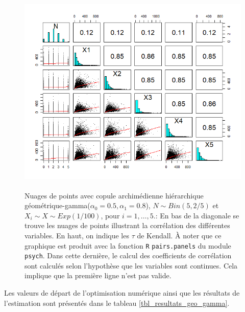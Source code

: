 \documentclass{article}
\begin{document}
	\begin{figure}[H]
		\centering
		\includegraphics[height=10cm]{Graph/scatterplot_geo_gamma.png}
		\caption[Nuages de points du scénario \ref{scenario_geo_gamma}]
		{Nuages de points avec copule archimédienne hiérarchique géométrique-gamma($\alpha_0=0.5, \alpha_1 = 0.8$), $N \sim Bin(5, 2/5)$ et $X_i \sim X \sim Exp(1/100)$, pour $i=1,\dots, 5$.:
			En bas de la diagonale se trouve les nuages de points illustrant la corrélation des différentes variables. En haut, on indique les $\tau$ de Kendall. À noter que ce graphique est produit avec la fonction \texttt{R} \texttt{pairs.panels} du module \texttt{psych}. Dans cette dernière, le calcul des coefficients de corrélation sont calculés selon l'hypothèse que les variables sont continues. Cela implique que la première ligne n'est pas valide.}
		\label{graph_scatterplot_geo_gamma}
	\end{figure}

	Les valeurs de départ de l'optimisation numérique ainsi que les résultats de l'estimation sont présentés dans le tableau \ref{tbl_resultats_geo_gamma}.
	
\end{document}
